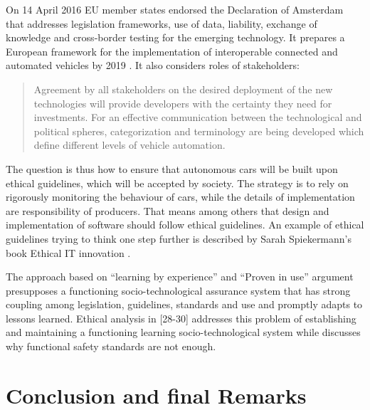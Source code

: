 On 14 April 2016 EU member states endorsed the Declaration of Amsterdam \cite{GovernmentNL2017} that addresses legislation frameworks, use of data, liability, exchange of knowledge and cross-border testing for the emerging technology. It prepares a European framework for the implementation of interoperable connected and automated vehicles by 2019 \cite{EthicsCommission2017b}. It also considers roles of stakeholders:

 \begin{quote}
 Agreement by all stakeholders on the desired deployment of the new technologies will provide developers with the certainty they need for investments. For an effective communication between the technological and political spheres, categorization and terminology are being developed which define different levels of vehicle automation. \cite{Pillath2016} %
 \end{quote} %
 
The question is thus how to ensure that autonomous cars will be built upon ethical guidelines, which will be accepted by society. The strategy is to rely on rigorously monitoring the behaviour of cars, while the details of implementation are responsibility of producers. That means among others that design and implementation of software should follow ethical guidelines. An example of ethical guidelines trying to think one step further is described by Sarah Spiekermann's book Ethical IT innovation \cite{spiekermann2015ethical}. 

The approach based on \enquote{learning by experience} and \enquote{Proven in use} argument \cite{GovernmentNL2017,NationalInstruments2014a,DBLP:journals/corr/SchabeB15} presupposes a functioning socio-technological assurance system that has strong coupling among legislation, guidelines, standards and use and promptly adapts to lessons learned. Ethical analysis in \cite{DodigCrnkovic2012, Thekkilakattil_7273594,Johnsen2017_7958474} [28-30] addresses this problem of establishing and maintaining a functioning learning socio-technological system while \cite{Johnsen2017_7958474} discusses why functional safety standards are not enough.


\section{Conclusion and final Remarks}
\label{sec:Conclusion}



